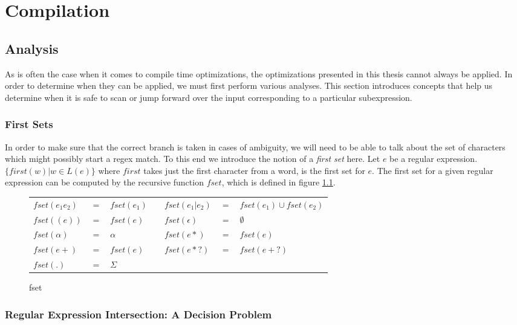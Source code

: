 \chapter{Compilation}
\label{chapter:compilation}

\section{Analysis}

As is often the case when it comes to compile time optimizations,
the optimizations presented in this thesis cannot always be
applied. In order to determine when they can be applied, we must
first perform various analyses. This section introduces concepts
that help us determine when it is safe to scan or jump forward over the
input corresponding to a particular subexpression.

\subsection{First Sets}

In order to make sure that the correct branch is taken in cases of
ambiguity, we will need to be able to talk about the set of characters
which might possibly start a regex match. To this end we introduce the
notion of a \emph{first set} here. Let $e$ be a regular expression.
$\{first(w) \rvert w \in L(e)\}$ where $first$ takes just the first character
from a word, is the first set for $e$. The first set for a given
regular expression can be computed by the recursive function $fset$,
which is defined in figure \ref{fig:fsetdef}.

\begin{figure}
\label{fig:fsetdef}
\caption{fset}
\begin{tabular}{l c l c l c l}
$fset(e_1 e_2)$ & $=$ & $fset(e_1)$ & &
  $fset(e_1 \rvert e_2)$ & $=$ & $fset(e_1) \cup fset(e_2)$ \\
$fset((e))$ & $=$ & $fset(e)$ & &
  $fset(\epsilon)$ & $=$ & $\emptyset$ \\
$fset(\alpha)$ & $=$ & $\alpha$ & &
  $fset(e*)$ & $=$ & $fset(e)$ \\
$fset(e+)$ & $=$ & $fset(e)$ & &
  $fset(e*?)$ & $=$ & $fset(e+?)$ \\
$fset(.)$ & $=$ & $\Sigma$ & & & & \\
\end{tabular}
\end{figure}

\subsection{Regular Expression Intersection: A Decision Problem}
\label{section:regexinterdecide}

